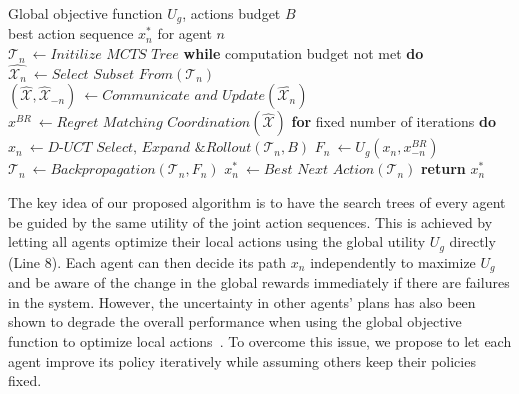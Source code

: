 \begin{algorithm}[ht!]
 \caption{A-MCTS algorithm for agent $n$}
 \label{alg:A-MCTS}
 \begin{algorithmic}[1]
 \renewcommand{\algorithmicrequire}{\textbf{Input:}}
 \REQUIRE Global objective function $U_g$, actions budget $B$\\
 \renewcommand{\algorithmicrequire}{\textbf{Output:}}
 \REQUIRE best action sequence $x^\ast_n$ for agent $n$\\
 \STATE $\mathcal{T}_n\ {\leftarrow}  \textit{Initilize MCTS Tree}$
 \STATE \textbf{while} computation budget not met \textbf{do}
 \STATE \quad $\hat{\mathcal{X}_n}\ {\leftarrow} \textit{Select Subset From} (\mathcal{T}_n)$
 \STATE \quad $(\hat{\mathcal{X}}, \hat{\mathcal{X}}_{-n})\ {\leftarrow} \textit{Communicate and Update} (\hat{\mathcal{X}_n})$
 \STATE \quad $x^{BR}\ {\leftarrow} \textit{Regret Matching Coordination} (\hat{\mathcal{X}})$
 \STATE \quad \textbf{for} fixed number of iterations \textbf{do}
 \STATE \quad \quad $x_n\ {\leftarrow} \textit{D-UCT Select, Expand \& Rollout} (\mathcal{T}_n, B)$
 \STATE \quad \quad $F_n\ {\leftarrow} U_g(x_n, x^{BR}_{-n})$ 
 \STATE \quad \quad  $\mathcal{T}_n\ {\leftarrow} Backpropagation (\mathcal{T}_n, F_n)$
 \STATE $x^\ast_n\ {\leftarrow} \textit{Best Next Action} (\mathcal{T}_n)$
 \STATE \textbf{return} $x^\ast_n$
 \end{algorithmic}
\end{algorithm}

The key idea of our proposed algorithm is to have the search trees of every agent be guided by the same utility of the joint action sequences. This is achieved by letting all agents optimize their local actions using the global utility $U_g$ directly (Line 8). Each agent can then decide its path $x_n$ independently to maximize $U_g$ and be aware of the change in the global rewards immediately if there are failures in the system.
However, the uncertainty in other agents' plans has also been shown to degrade the overall performance when using the global objective function to optimize local actions~\citep{wolpert2013probability}. To overcome this issue, we propose to let each agent improve its policy iteratively while assuming others keep their policies fixed.

